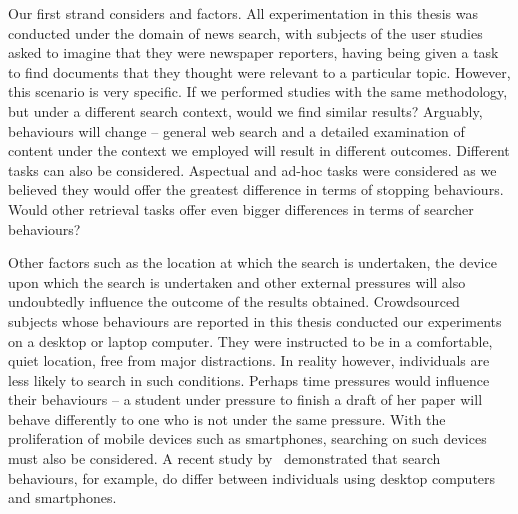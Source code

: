 \begin{figure}[h!]
    \centering
\end{figure}

Our first strand considers  and  factors. All experimentation in this thesis was conducted under the domain of news search, with subjects of the user studies asked to imagine that they were newspaper reporters, having being given a task to find documents that they thought were relevant to a particular topic. However, this scenario is very specific. If we performed studies with the same methodology, but under a different search context, would we find similar results? Arguably, behaviours will change -- general web search and a detailed examination of content under the context we employed will result in different outcomes. Different tasks can also be considered. Aspectual and ad-hoc tasks were considered as we believed they would offer the greatest difference in terms of stopping behaviours. Would other retrieval tasks offer even bigger differences in terms of searcher behaviours?

Other factors such as the location at which the search is undertaken, the device upon which the search is undertaken and other external pressures will also undoubtedly influence the outcome of the results obtained. Crowdsourced subjects whose behaviours are reported in this thesis conducted our experiments on a desktop or laptop computer. They were instructed to be in a comfortable, quiet location, free from major distractions. In reality however, individuals are less likely to search in such conditions. Perhaps time pressures would influence their behaviours -- a student under pressure to finish a draft of her paper will behave differently to one who is not under the same pressure. With the proliferation of mobile devices such as smartphones, searching on such devices must also be considered. A recent study by~\cite{ong2017scent_behaviour} demonstrated that search behaviours, for example, do differ between individuals using desktop computers and smartphones.

